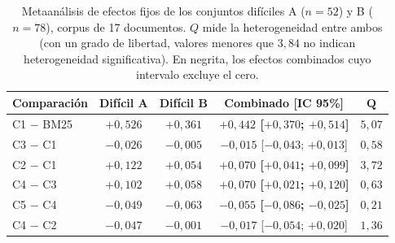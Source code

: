 \begin{table}[htbp]
\centering
\footnotesize
\setlength{\tabcolsep}{5pt}
\renewcommand{\arraystretch}{1.25}
\caption{Metaanálisis de efectos fijos de los conjuntos difíciles A ($n=52$) y B ($n=78$), corpus de 17 documentos. $Q$ mide la heterogeneidad entre ambos (con un grado de libertad, valores menores que $3{,}84$ no indican heterogeneidad significativa). En negrita, los efectos combinados cuyo intervalo excluye el cero.}
\label{tab:meta}
\begin{tabularx}{\textwidth}{@{}l C C C C@{}}
\toprule
\textbf{Comparación} & \textbf{Difícil A} & \textbf{Difícil B} & \textbf{Combinado [IC 95\%]} & $\boldsymbol{Q}$ \\
\midrule
C1 $-$ BM25 & $+0{,}526$ & $+0{,}361$ & {\boldmath\bfseries $+0{,}442$ [$+0{,}370$; $+0{,}514$]} & $5{,}07$ \\
C3 $-$ C1 & $-0{,}026$ & $-0{,}005$ & $-0{,}015$ [$-0{,}043$; $+0{,}013$] & $0{,}58$ \\
C2 $-$ C1 & $+0{,}122$ & $+0{,}054$ & {\boldmath\bfseries $+0{,}070$ [$+0{,}041$; $+0{,}099$]} & $3{,}72$ \\
C4 $-$ C3 & $+0{,}102$ & $+0{,}058$ & {\boldmath\bfseries $+0{,}070$ [$+0{,}021$; $+0{,}120$]} & $0{,}63$ \\
C5 $-$ C4 & $-0{,}049$ & $-0{,}063$ & {\boldmath\bfseries $-0{,}055$ [$-0{,}086$; $-0{,}025$]} & $0{,}21$ \\
C4 $-$ C2 & $-0{,}047$ & $-0{,}001$ & $-0{,}017$ [$-0{,}054$; $+0{,}020$] & $1{,}36$ \\
\bottomrule
\end{tabularx}
\end{table}

